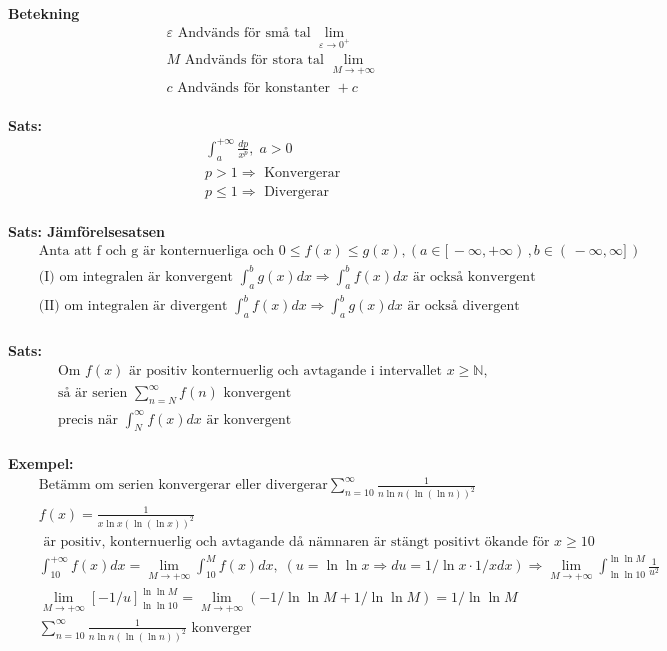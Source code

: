 \textbf{Betekning}
\begin{align*}
  &\quad  \varepsilon \text{ Andvänds för små tal }  \lim_{\varepsilon \to 0^+} \\
  &\quad  M \text{ Andvänds för stora tal } \lim_{M \to +\infty} \\
  &\quad  c \text{ Andvänds för konstanter } +c \\
\end{align*}

\textbf{Sats: }
\begin{align*}
  &\quad  \int_a^{+\infty} \frac{dp}{x^p}, \; a>0 \\
  &\quad  p > 1 \Rightarrow \text{ Konvergerar} \\
  &\quad  p \leq 1 \Rightarrow \text{ Divergerar} \\
\end{align*}

\textbf{Sats: Jämförelsesatsen}
\begin{align*}
  &\quad  \text{Anta att f och g är konternuerliga och } 0 \leq f(x) \leq g(x),
  ( a \in [ \, -\infty,+\infty ) \, , b \in ( \, -\infty,\infty ] \, )\\
  &\quad  \text{(I) om integralen är konvergent } \int_a^b g(x)dx \Rightarrow \int_a^b f(x)dx
  \text{ är också konvergent} \\
  &\quad \text{(II) om integralen är divergent } \int_a^b f(x)dx \Rightarrow \int_a^b g(x)dx
  \text{ är också divergent} \\
\end{align*}

\textbf{Sats: }
\begin{align*}
  &\quad  \text{Om $f(x)$ är positiv konternuerlig och avtagande i intervallet $x\geq\mathbb{N}$,} \\
  &\quad  \text{så är serien }  \displaystyle\sum_{n=N}^{\infty} f(n) \text{ konvergent} \\ 
  &\quad  \text{precis när  }  \int_N^{\infty} f(x)dx \text{ är konvergent} \\
\end{align*}

\textbf{Exempel: }
\begin{align*}
  &\quad  \text{Betämm om serien konvergerar eller divergerar}
  \displaystyle\sum_{n=10}^{\infty} \frac{1}{n\ln{n}{(\ln{(\ln{n})})}^2}  \\
  &\quad  f(x) = \frac{1}{x\ln{x}{(\ln{(\ln{x})})}^2} \\
  &\quad \text{ är positiv, konternuerlig och avtagande då nämnaren är stängt positivt ökande för }
  x \geq 10 \\
  &\quad  \int_{10}^{+\infty} f(x)dx = \lim_{M\to\mathbb{+\infty}} \int_{10}^{M} f(x)dx, \;
  (u=\ln{\ln{x}} \Rightarrow du = 1/\ln{x} \cdot 1/x dx) \Rightarrow
  \lim_{M\to+\infty} \int_{\ln{\ln{10}}}^{\ln{\ln{M}}} \frac{1}{u^2} \\
  &\quad  \lim_{M\to+\infty} {[-1/u]}_{\ln{\ln{10}}}^{\ln{\ln{M}}} =
  \lim_{M\to+\infty} (-1/\ln{\ln{M}}+1/\ln{\ln{M}}) = 1/\ln{\ln{M}} \\
  &\quad  \displaystyle\sum_{n=10}^{\infty} \frac{1}{n\ln{n}{(\ln{(\ln{n})})}^2} \text{ konverger} \\
\end{align*}

